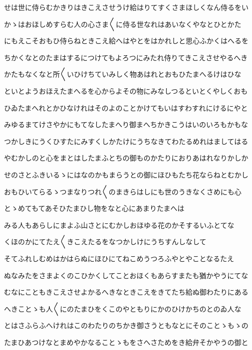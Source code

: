 \documentclass[a4paper,11pt,landscape]{ltjtarticle}
\begin{document}
\par\medskip
せは世に侍らむかきりはきこえさせうけ給はりてすくさまほしくなん侍るをい
\par\medskip
かゝはおほしめすらむ人の心さま〱に侍る世なれはあいなくやなとひとかた
\par\medskip
にもえこそおもひ侍らねときこえ給へはやとをはかれしと思心ふかくはへるを
\par\medskip
ちかくなとのたまはするにつけてもよろつにみたれ侍りてきこえさせやるへき
\par\medskip
かたもなくなと所〱いひけちていみしく物あはれとおもひたまへるけはひな
\par\medskip
といとようおほえたまへるを心からよその物にみなしつるといとくやしくおも
\par\medskip
ひゐたまへれとかひなけれはそのよのことかけてもいはすわすれにけるにやと
\par\medskip
みゆるまてけさやかにもてなしたまへり御まへちかきこうはいのいろもかもな
\par\medskip
つかしきにうくひすたにみすくしかたけにうちなきてわたるめれはましてはる
\par\medskip
やむかしのと心をまとはしたまふとちの御ものかたりにおりあはれなりかしか
\par\medskip
せのさとふきいるゝにはなのかもまらうとの御にほひもたち花ならねとむかし
\par\medskip
おもひいてらるゝつまなりつれ〱のまきらはしにも世のうきなくさめにも心
\par\medskip
とゝめてもてあそひたまひし物をなと心にあまりたまへは
\par\medskip
みる人もあらしにまよふ山さとにむかしおほゆる花のかそするいふとてな
\par\medskip
くほのかにてたえ〱きこえたるをなつかしけにうちすんしなして
\par\medskip
そてふれしむめはかはらぬにほひにてねこめうつろふやとやことなるたえ
\par\medskip
ぬなみたをさまよくのこひかくしてことおほくもあらすまたも猶かやうにてな
\par\medskip
むなにこともきこえさせよかるへきなときこえをきてたち給ぬ御わたりにある
\par\medskip
へきことゝも人〱にのたまひをくこのやともりにかのひけかちのとのゐ人な
\par\medskip
とはさふらふへけれはこのわたりのちかき御さうともなとにそのことゝもゝの
\par\medskip
たまひあつけなとまめやかなることゝもをさへさためをき給弁そかやうの御と
\par\medskip
\end{document}
